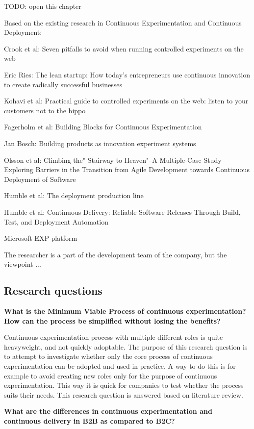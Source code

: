 \documentclass[english]{tktltiki2}
\theoremstyle{definition}
\theoremstyle{remark}
\begin{document}
TODO: open this chapter

Based on the existing research in Continuous Experimentation and Continuous Deployment:

Crook et al: Seven pitfalls to avoid when running controlled experiments on the web

Eric Ries: The lean startup: How today's entrepreneurs use continuous innovation to create radically successful businesses

Kohavi et al: Practical guide to controlled experiments on the web: listen to your customers not to the hippo

Fagerholm et al: Building Blocks for Continuous Experimentation

Jan Bosch: Building products as innovation experiment systems

Olsson et al: Climbing the" Stairway to Heaven"--A Multiple-Case Study Exploring Barriers in the Transition from Agile Development towards Continuous Deployment of Software

Humble et al: The deployment production line

Humble et al: Continuous Delivery: Reliable Software Releases Through Build, Test, and Deployment Automation

Microsoft EXP platform

The researcher is a part of the development team of the company, but the viewpoint ...

\subsection{Research questions} %
\noindent \textbf{What is the Minimum Viable Process of continuous experimentation? How can the process be simplified without losing the benefits?}

\noindent Continuous experimentation process with multiple different roles is quite heavyweight, and not quickly adoptable. The purpose of this research question is to attempt to investigate whether only the core process of continuous experimentation can be adopted and used in practice. A way to do this is for example to avoid creating new roles only for the purpose of continuous experimentation. This way it is quick for companies to test whether the process suits their needs. This research question is answered based on literature review. \newline

\noindent \textbf{What are the differences in continuous experimentation and continuous delivery in B2B as compared to B2C?}
\end{document}
